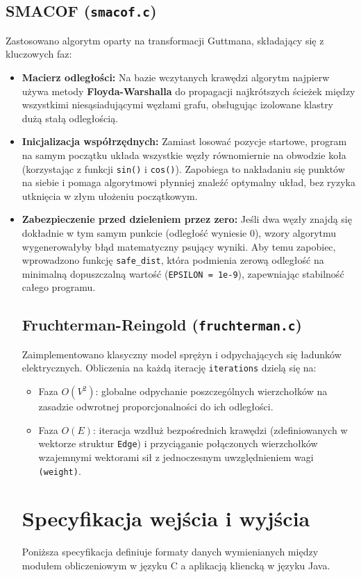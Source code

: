 \documentclass[12pt,a4paper]{article}
\begin{document}
\subsection{SMACOF (\texttt{smacof.c})}
Zastosowano algorytm oparty na transformacji Guttmana, składający się z kluczowych faz:
\begin{itemize}
    \item \textbf{Macierz odległości:} Na bazie wczytanych krawędzi algorytm najpierw używa metody \textbf{Floyda-Warshalla} do propagacji najkrótszych ścieżek między wszystkimi niesąsiadującymi węzłami grafu, obsługując izolowane klastry dużą stałą odległością.
    \item \textbf{Inicjalizacja współrzędnych:} Zamiast losować pozycje startowe, program na samym początku układa wszystkie węzły równomiernie na obwodzie koła (korzystając z funkcji \texttt{sin()} i \texttt{cos()}). Zapobiega to nakładaniu się punktów na siebie i pomaga algorytmowi płynniej znaleźć optymalny układ, bez ryzyka utknięcia w złym ułożeniu początkowym.
    \item \textbf{Zabezpieczenie przed dzieleniem przez zero:} Jeśli dwa węzły znajdą się dokładnie w tym samym punkcie (odległość wyniesie 0), wzory algorytmu wygenerowałyby błąd matematyczny psujący wyniki. Aby temu zapobiec, wprowadzono funkcję \texttt{safe\_dist}, która podmienia zerową odległość na minimalną dopuszczalną wartość (\texttt{EPSILON = 1e-9}), zapewniając stabilność całego programu.

\subsection{Fruchterman-Reingold (\texttt{fruchterman.c})}
Zaimplementowano klasyczny model sprężyn i odpychających się ładunków elektrycznych. Obliczenia na każdą iterację \texttt{iterations} dzielą się na:
\begin{itemize}
    \item Faza $O(V^2)$: globalne odpychanie poszczególnych wierzchołków na zasadzie odwrotnej proporcjonalności do ich odległości.
    \item Faza $O(E)$: iteracja wzdłuż bezpośrednich krawędzi (zdefiniowanych w wektorze struktur \texttt{Edge}) i przyciąganie połączonych wierzchołków wzajemnymi wektorami sił z jednoczesnym uwzględnieniem wagi \texttt{(weight)}.
\end{itemize}

\section{Specyfikacja wejścia i wyjścia}
Poniższa specyfikacja definiuje formaty danych wymienianych między modułem obliczeniowym w języku C a aplikacją kliencką w języku Java.


\end{itemize}
\end{document}
